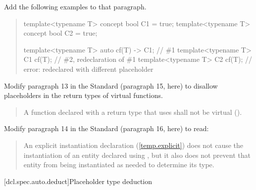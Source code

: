 Add the following examples to that paragraph.

\begin{quote}
\begin{addedblock}
\begin{codeblock}
template<typename T> concept bool C1 = true;
template<typename T> concept bool C2 = true;

template<typename T> auto cf(T) -> C1; // \#1
template<typename T> C1 cf(T);         // \#2, redeclaration of \#1
template<typename T> C2 cf(T);         // error: redeclared with different placeholder
\end{codeblock}
\end{addedblock}
\end{quote}

Modify paragraph 13 in the \Cpp Standard (paragraph 15, here) to disallow
placeholders in the return types of virtual functions.

\begin{quote}
\pnum
A function declared with a return type that uses 
shall not be virtual ().
\end{quote}


Modify paragraph 14 in the \Cpp Standard (paragraph 16, here) to read:

\begin{quote}
\pnum
An explicit instantiation declaration (\ref{temp.explicit}) does not cause the 
instantiation of an entity declared using 
,
but it also does not prevent that entity from being instantiated as needed to
determine its type. 
\end{quote}


[dcl.spec.auto.deduct]{Placeholder type deduction}


